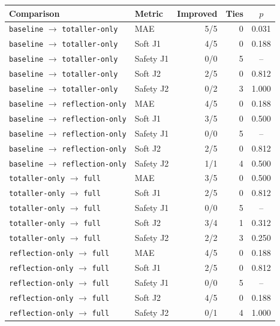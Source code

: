 \begin{tabular}{llrrS[table-format=1.3]}
\toprule
Comparison & Metric & {Improved} & {Ties} & {$p$} \\
\midrule
\texttt{baseline} $\to$ \texttt{totaller-only} & MAE & 5/5 & 0 & 0.031 \\
\texttt{baseline} $\to$ \texttt{totaller-only} & Soft J1 & 4/5 & 0 & 0.188 \\
\texttt{baseline} $\to$ \texttt{totaller-only} & Safety J1 & 0/0 & 5 & {--} \\
\texttt{baseline} $\to$ \texttt{totaller-only} & Soft J2 & 2/5 & 0 & 0.812 \\
\texttt{baseline} $\to$ \texttt{totaller-only} & Safety J2 & 0/2 & 3 & 1.000 \\
\midrule
\texttt{baseline} $\to$ \texttt{reflection-only} & MAE & 4/5 & 0 & 0.188 \\
\texttt{baseline} $\to$ \texttt{reflection-only} & Soft J1 & 3/5 & 0 & 0.500 \\
\texttt{baseline} $\to$ \texttt{reflection-only} & Safety J1 & 0/0 & 5 & {--} \\
\texttt{baseline} $\to$ \texttt{reflection-only} & Soft J2 & 2/5 & 0 & 0.812 \\
\texttt{baseline} $\to$ \texttt{reflection-only} & Safety J2 & 1/1 & 4 & 0.500 \\
\midrule
\texttt{totaller-only} $\to$ \texttt{full} & MAE & 3/5 & 0 & 0.500 \\
\texttt{totaller-only} $\to$ \texttt{full} & Soft J1 & 2/5 & 0 & 0.812 \\
\texttt{totaller-only} $\to$ \texttt{full} & Safety J1 & 0/0 & 5 & {--} \\
\texttt{totaller-only} $\to$ \texttt{full} & Soft J2 & 3/4 & 1 & 0.312 \\
\texttt{totaller-only} $\to$ \texttt{full} & Safety J2 & 2/2 & 3 & 0.250 \\
\midrule
\texttt{reflection-only} $\to$ \texttt{full} & MAE & 4/5 & 0 & 0.188 \\
\texttt{reflection-only} $\to$ \texttt{full} & Soft J1 & 2/5 & 0 & 0.812 \\
\texttt{reflection-only} $\to$ \texttt{full} & Safety J1 & 0/0 & 5 & {--} \\
\texttt{reflection-only} $\to$ \texttt{full} & Soft J2 & 4/5 & 0 & 0.188 \\
\texttt{reflection-only} $\to$ \texttt{full} & Safety J2 & 0/1 & 4 & 1.000 \\
\bottomrule
\end{tabular}
